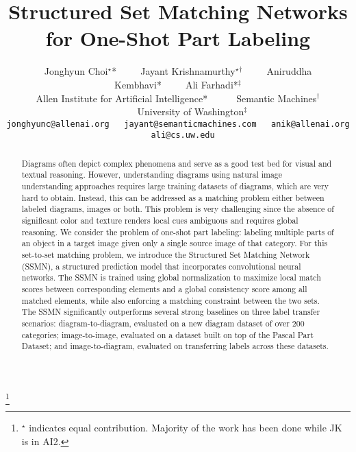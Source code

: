 \documentclass[10pt,twocolumn,letterpaper]{article}
\newcommand\blfootnote[1]{%
  \begingroup
  \renewcommand\thefootnote{}\footnote{#1}%
  \addtocounter{footnote}{-1}%
  \endgroup
}
\begin{document}
\title{Structured Set Matching Networks for One-Shot Part Labeling}

\author{Jonghyun Choi$^\star$*~~~~~Jayant Krishnamurthy$^\star$$^\dagger$~~~~~Aniruddha Kembhavi*~~~~~Ali Farhadi*$^\ddagger$
\vspace{0.4em}\\
Allen Institute for Artificial Intelligence*~~~~~~Semantic Machines$^\dagger$~~~~~~University of Washington$^\ddagger$\\
{\tt\small jonghyunc@allenai.org~~~jayant@semanticmachines.com~~~anik@allenai.org~~ali@cs.uw.edu}
}

\maketitle


\begin{abstract}
Diagrams often depict complex phenomena and serve as a good test bed for visual and textual reasoning. However, understanding diagrams using natural image understanding approaches requires large training datasets of diagrams, which are very hard to obtain. Instead, this can be addressed as a matching problem either between labeled diagrams, images or both. This problem is very challenging since the absence of significant color and texture renders local cues ambiguous and requires global reasoning. We consider the problem of one-shot part labeling: labeling multiple parts of an object in a target image given only a single source image of that category. For this set-to-set matching problem, we introduce the Structured Set Matching Network (SSMN), a structured prediction model that incorporates convolutional neural networks. The SSMN is trained using global normalization to maximize local match scores between corresponding elements and a global consistency score among all matched elements, while also enforcing a matching constraint between the two sets. The SSMN significantly outperforms several strong baselines on three label transfer scenarios: diagram-to-diagram, evaluated on a new diagram dataset of over 200 categories; image-to-image, evaluated on a dataset built on top of the Pascal Part Dataset; and image-to-diagram, evaluated on transferring labels across these datasets.

\end{abstract}
\vspace{-1em}

\blfootnote{\hspace{-2em} \noindent $^\star$ indicates equal contribution. Majority of the work has been done while JK is in AI2.}
\end{document}
